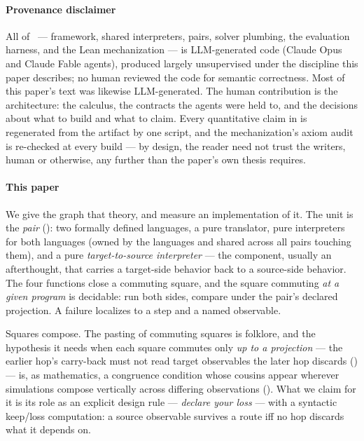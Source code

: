 \paragraph{Provenance disclaimer}
All of \hg\ --- framework, shared interpreters, pairs, solver plumbing,
the evaluation harness, and the Lean mechanization --- is LLM-generated
code (Claude Opus and Claude Fable agents), produced largely
unsupervised under the discipline this paper describes; no human
reviewed the code for semantic correctness. Most of this paper's text
was likewise LLM-generated. The human contribution is the
architecture: the calculus, the contracts the agents were held to, and
the decisions about what to build and what to claim. Every
quantitative claim in  is regenerated from the
artifact by one script, and the mechanization's axiom audit is
re-checked at every build --- by design, the reader need not trust the
writers, human or otherwise, any further than the paper's own thesis
requires.

\paragraph{This paper}
We give the graph that theory, and measure an implementation of it. The
unit is the
\emph{pair} (): two formally defined languages, a pure
translator, pure interpreters for both languages (owned by the languages
and shared across all pairs touching them), and a pure
\emph{target-to-source interpreter} --- the component, usually an
afterthought, that carries a target-side behavior back to a source-side
behavior. The four functions close a commuting square, and the square
commuting \emph{at a given program} is decidable: run both sides, compare
under the pair's declared projection. A failure localizes to a step and a
named observable.

Squares compose. The pasting of commuting squares is folklore, and the
hypothesis it needs when each square commutes only \emph{up to a
projection} --- the earlier hop's carry-back must not read target
observables the later hop discards () ---
is, as mathematics, a congruence condition whose cousins appear wherever
simulations compose vertically across differing observations
(). What we claim for it is its role as an explicit
design rule --- \emph{declare your loss} --- with a syntactic keep/loss
computation: a source observable survives a route iff no hop discards
what it depends on.


